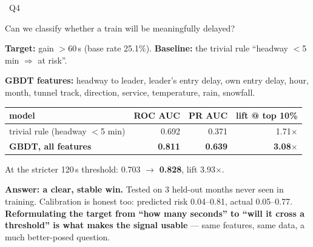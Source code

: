 \documentclass[aspectratio=169,10pt]{beamer}
\newcommand{\srcnote}[1]{{\scriptsize\color{ink3}#1}}
\newcommand{\hl}[1]{{\color{corange}\textbf{#1}}}
\newcommand{\qtag}[1]{{\scriptsize\color{surface}\colorbox{cblue}{\strut~Q#1~}}}
\begin{document}
\begin{frame}{\qtag{4} Can we classify whether a train will be meaningfully delayed?}
  \textbf{Target:} gain $>$60\,s (base rate 25.1\%).
  \textbf{Baseline:} the trivial rule ``headway $<$5\,min $\Rightarrow$ at risk''.

  \vspace{0.3em}
  \srcnote{\textbf{GBDT features:} headway to leader, leader's entry delay, own
  entry delay, hour, month, tunnel track, direction, service, temperature, rain,
  snowfall.}

  \vspace{0.4em}
  \centering
  \begin{tabular}{@{}lrrr@{}}
    \toprule
    model & ROC AUC & PR AUC & lift @ top 10\% \\
    \midrule
    trivial rule (headway $<$5 min) & 0.692 & 0.371 & 1.71$\times$ \\
    \textbf{GBDT, all features} & \textbf{0.811} & \textbf{0.639} & \textbf{3.08$\times$} \\
    \bottomrule
  \end{tabular}

  \vspace{0.3em}
  \srcnote{At the stricter 120\,s threshold: 0.703 $\to$ \textbf{0.828}, lift 3.93$\times$.}

  \vspace{0.5em}
  \raggedright
  \textbf{Answer: a clear, stable win.} Tested on 3 held-out months never seen in
  training. Calibration is honest too: predicted risk 0.04--0.81, actual
  0.05--0.77. \hl{Reformulating the target from ``how many seconds'' to ``will it
  cross a threshold'' is what makes the signal usable} --- same features, same
  data, a much better-posed question.
\end{frame}
\end{document}
